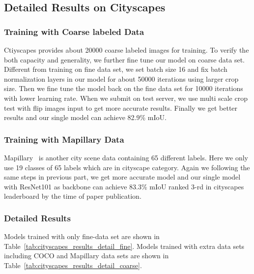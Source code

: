 \documentclass{bmvc2k}
\begin{document}
\subsection{Detailed Results on Cityscapes}
\subsubsection{Training with Coarse labeled Data}
Ctiyscapes provides about 20000 coarse labeled images for training. To verify the 
both capacity and generality, we further fine tune our model on coarse data set.
Different from training on fine data set, we set batch size 16 and fix batch normalization layers in our model for about 50000 iterations using larger crop size. Then we fine tune the model back on the fine data set for 10000 iterations with lower learning rate. When we submit on test server, we use multi scale crop test with flip images input to get more accurate results. Finally we get better results and our single model can achieve 82.9\% mIoU.
\subsubsection{Training with Mapillary Data}
Mapillary~\cite{mapillary} is another city scene data containing 65 different labels. Here we only use 19 classes of 65 labels which are in cityscape category. Again we following the same steps in previous part,
we get more accurate model and our single model with ResNet101 as backbone can achieve 83.3\% mIoU ranked 3-rd in cityscapes leaderboard by the time of paper publication.
\subsubsection{Detailed Results}
Models trained with only fine-data set are shown in Table~\ref{tab:cityscapes_results_detail_fine}.
Models trained with extra data sets including COCO and Mapillary data sets are shown in Table~\ref{tab:cityscapes_results_detail_coarse}.
\end{document}
